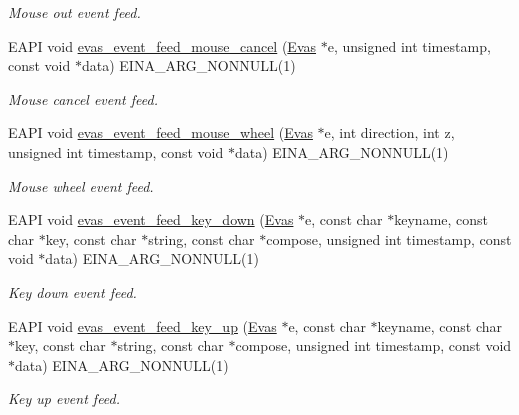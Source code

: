 \begin{DoxyCompactItemize}
\begin{DoxyCompactList}\small\item\em Mouse out event feed. \item\end{DoxyCompactList}\item 
EAPI void \hyperlink{group__Evas__Event__Feeding__Group_ga5c300cdca8551fd49d5341ef19c8f385}{evas\_\-event\_\-feed\_\-mouse\_\-cancel} (\hyperlink{group__Evas__Canvas_ga5ff87cc4ce6bc43e3b640a6d37f73043}{Evas} $\ast$e, unsigned int timestamp, const void $\ast$data) EINA\_\-ARG\_\-NONNULL(1)
\begin{DoxyCompactList}\small\item\em Mouse cancel event feed. \item\end{DoxyCompactList}\item 
EAPI void \hyperlink{group__Evas__Event__Feeding__Group_ga393156722bbe1ce384f0ab33ab76a1f2}{evas\_\-event\_\-feed\_\-mouse\_\-wheel} (\hyperlink{group__Evas__Canvas_ga5ff87cc4ce6bc43e3b640a6d37f73043}{Evas} $\ast$e, int direction, int z, unsigned int timestamp, const void $\ast$data) EINA\_\-ARG\_\-NONNULL(1)
\begin{DoxyCompactList}\small\item\em Mouse wheel event feed. \item\end{DoxyCompactList}\item 
EAPI void \hyperlink{group__Evas__Event__Feeding__Group_ga096e2ef05bfa471d2773729bd24732a0}{evas\_\-event\_\-feed\_\-key\_\-down} (\hyperlink{group__Evas__Canvas_ga5ff87cc4ce6bc43e3b640a6d37f73043}{Evas} $\ast$e, const char $\ast$keyname, const char $\ast$key, const char $\ast$string, const char $\ast$compose, unsigned int timestamp, const void $\ast$data) EINA\_\-ARG\_\-NONNULL(1)
\begin{DoxyCompactList}\small\item\em Key down event feed. \item\end{DoxyCompactList}\item 
EAPI void \hyperlink{group__Evas__Event__Feeding__Group_gaebe7d4f8b6423aff1ffe67c724d4590d}{evas\_\-event\_\-feed\_\-key\_\-up} (\hyperlink{group__Evas__Canvas_ga5ff87cc4ce6bc43e3b640a6d37f73043}{Evas} $\ast$e, const char $\ast$keyname, const char $\ast$key, const char $\ast$string, const char $\ast$compose, unsigned int timestamp, const void $\ast$data) EINA\_\-ARG\_\-NONNULL(1)
\begin{DoxyCompactList}\small\item\em Key up event feed. \item\end{DoxyCompactList}\item 

\end{DoxyCompactItemize}
